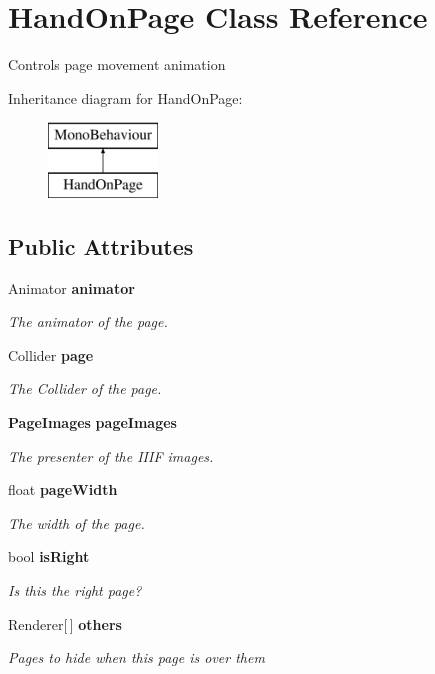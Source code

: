 \section{Hand\+On\+Page Class Reference}
\label{class_hand_on_page}


Controls page movement animation  


Inheritance diagram for Hand\+On\+Page\+:\begin{figure}[H]
\begin{center}
\leavevmode
\includegraphics[height=2.000000cm]{class_hand_on_page}
\end{center}
\end{figure}
\subsection*{Public Attributes}
\begin{DoxyCompactItemize}
\item 
Animator {\bf animator}
\begin{DoxyCompactList}\small\item\em The animator of the page. \end{DoxyCompactList}\item 
Collider {\bf page}
\begin{DoxyCompactList}\small\item\em The Collider of the page. \end{DoxyCompactList}\item 
{\bf Page\+Images} {\bf page\+Images}
\begin{DoxyCompactList}\small\item\em The presenter of the I\+I\+IF images. \end{DoxyCompactList}\item 
float {\bf page\+Width}
\begin{DoxyCompactList}\small\item\em The width of the page. \end{DoxyCompactList}\item 
bool {\bf is\+Right}
\begin{DoxyCompactList}\small\item\em Is this the right page? \end{DoxyCompactList}\item 
Renderer[$\,$] {\bf others}
\begin{DoxyCompactList}\small\item\em Pages to hide when this page is over them \end{DoxyCompactList}\end{DoxyCompactItemize}



